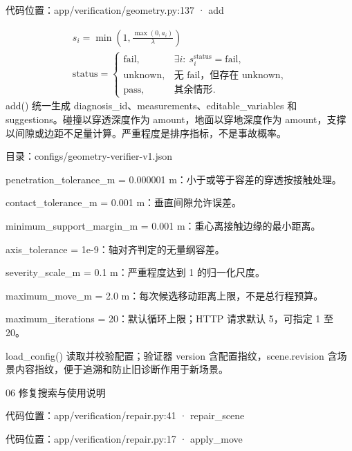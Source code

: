 \documentclass[10pt,a4paper]{article}
\begin{document}
{\footnotesize\color{ink} 代码位置：app/verification/geometry.py:137 · add\par}
\par{}
\[\begin{gathered}s_i=\min\left(1,\frac{\max(0,a_i)}{\lambda}\right)\\ \mathrm{status}=\begin{cases}\mathrm{fail},&\exists i:\ s_i^{\mathrm{status}}=\mathrm{fail},\\\mathrm{unknown},&\text{无 fail，但存在 unknown},\\\mathrm{pass},&\text{其余情形}.\end{cases}\end{gathered}\]
add() 统一生成 diagnosis\_id、measurements、editable\_variables 和 suggestions。碰撞以穿透深度作为 amount，地面以穿地深度作为 amount，支撑以间隙或边距不足量计算。严重程度是排序指标，不是事故概率。\par
\par{}
{\footnotesize\color{ink} 目录：configs/geometry-verifier-v1.json\par}
penetration\_tolerance\_m = 0.000001 m：小于或等于容差的穿透按接触处理。\par
contact\_tolerance\_m = 0.001 m：垂直间隙允许误差。\par
minimum\_support\_margin\_m = 0.001 m：重心离接触边缘的最小距离。\par
axis\_tolerance = 1e-9：轴对齐判定的无量纲容差。\par
severity\_scale\_m = 0.1 m：严重程度达到 1 的归一化尺度。\par
maximum\_move\_m = 2.0 m：每次候选移动距离上限，不是总行程预算。\par
maximum\_iterations = 20：默认循环上限；HTTP 请求默认 5，可指定 1 至 20。\par
{\footnotesize\color{ink} load\_config() 读取并校验配置；验证器 version 含配置指纹，scene.revision 含场景内容指纹，便于追溯和防止旧诊断作用于新场景。\par}
\clearpage
{\color{ink}\LARGE 06 修复搜索与使用说明\par}\vspace{5pt}
{\footnotesize\color{ink} 代码位置：app/verification/repair.py:41 · repair\_scene\par}
{\footnotesize\color{ink} 代码位置：app/verification/repair.py:17 · apply\_move\par}
\end{document}
